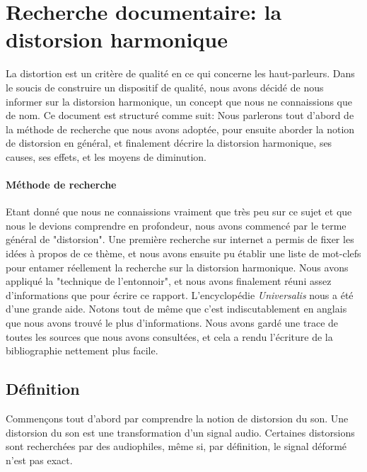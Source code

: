 \documentclass{article}
\begin{document}
\section{Recherche documentaire: la distorsion harmonique}


La distortion est un critère de qualité en ce qui concerne les haut-parleurs. Dans le soucis de construire un dispositif de qualité, nous avons décidé de nous informer sur la distorsion harmonique, un concept que nous ne connaissions que de nom.
Ce document est structuré comme suit: Nous parlerons tout d'abord de la méthode de recherche que nous avons adoptée, pour ensuite aborder la notion  de distorsion en général, et finalement décrire la distorsion harmonique, ses causes, ses effets, et les moyens de diminution.

\paragraph{Méthode de recherche}
Etant donné que nous ne connaissions vraiment que très peu sur ce sujet et que nous le devions comprendre en profondeur, nous avons commencé par le terme général de "distorsion". Une première recherche sur internet a permis de fixer les idées à propos de ce thème, et nous avons ensuite pu établir une liste de mot-clefs pour entamer réellement la recherche sur la distorsion harmonique. Nous avons appliqué la "technique de l'entonnoir", et nous avons finalement réuni assez d'informations que pour écrire ce rapport. L'encyclopédie \textit{Universalis} nous a été d'une grande aide. Notons tout de même que c'est indiscutablement en anglais que nous avons trouvé le plus d'informations. Nous avons gardé une trace de toutes les sources que nous avons consultées, et cela a rendu l'écriture de la bibliographie nettement plus facile.



\subsection{Définition}
Commençons tout d'abord par comprendre la notion de distorsion du son. Une distorsion du son est une transformation d'un signal audio. Certaines distorsions sont recherchées par des audiophiles, même si, par définition, le signal déformé n'est pas exact. 
\end{document}

